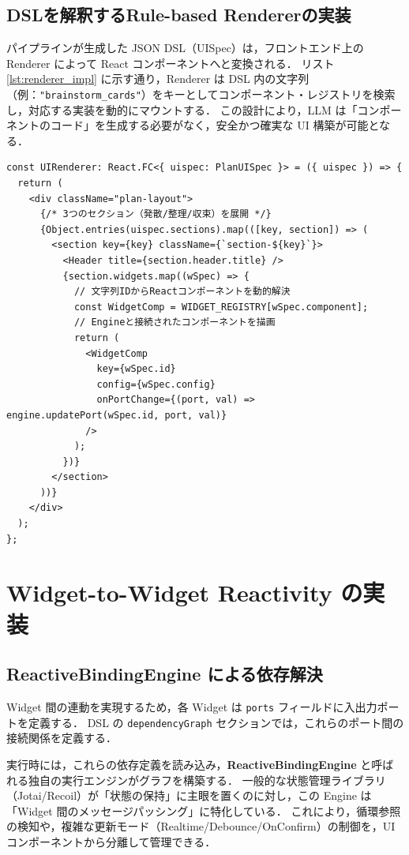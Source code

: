 \documentclass[senior,final,11pt,dvipdfmx]{iputit-thesis}
\begin{document}
\subsection{DSLを解釈するRule-based Rendererの実装}
パイプラインが生成した JSON DSL（UISpec）は，フロントエンド上の Renderer によって React コンポーネントへと変換される．
リスト\ref{lst:renderer_impl} に示す通り，Renderer は DSL 内の文字列（例：\texttt{"brainstorm\_cards"}）をキーとしてコンポーネント・レジストリを検索し，対応する実装を動的にマウントする．
この設計により，LLM は「コンポーネントのコード」を生成する必要がなく，安全かつ確実な UI 構築が可能となる．

\begin{lstlisting}[caption = Rule-based Rendererの実装（React/TypeScript概要）, label = lst:renderer_impl]
const UIRenderer: React.FC<{ uispec: PlanUISpec }> = ({ uispec }) => {
  return (
    <div className="plan-layout">
      {/* 3つのセクション（発散/整理/収束）を展開 */}
      {Object.entries(uispec.sections).map(([key, section]) => (
        <section key={key} className={`section-${key}`}>
          <Header title={section.header.title} />
          {section.widgets.map((wSpec) => {
            // 文字列IDからReactコンポーネントを動的解決
            const WidgetComp = WIDGET_REGISTRY[wSpec.component];
            // Engineと接続されたコンポーネントを描画
            return (
              <WidgetComp 
                key={wSpec.id} 
                config={wSpec.config}
                onPortChange={(port, val) => engine.updatePort(wSpec.id, port, val)}
              />
            );
          })}
        </section>
      ))}
    </div>
  );
};
\end{lstlisting}

\section{Widget-to-Widget Reactivity の実装}


\subsection{ReactiveBindingEngine による依存解決}

Widget 間の連動を実現するため，各 Widget は \texttt{ports} フィールドに入出力ポートを定義する．
DSL の \texttt{dependencyGraph} セクションでは，これらのポート間の接続関係を定義する．

実行時には，これらの依存定義を読み込み，\textbf{ReactiveBindingEngine} と呼ばれる独自の実行エンジンがグラフを構築する．
一般的な状態管理ライブラリ（Jotai/Recoil）が「状態の保持」に主眼を置くのに対し，この Engine は「Widget 間のメッセージパッシング」に特化している．
これにより，循環参照の検知や，複雑な更新モード（Realtime/Debounce/OnConfirm）の制御を，UI コンポーネントから分離して管理できる．
\end{document}
